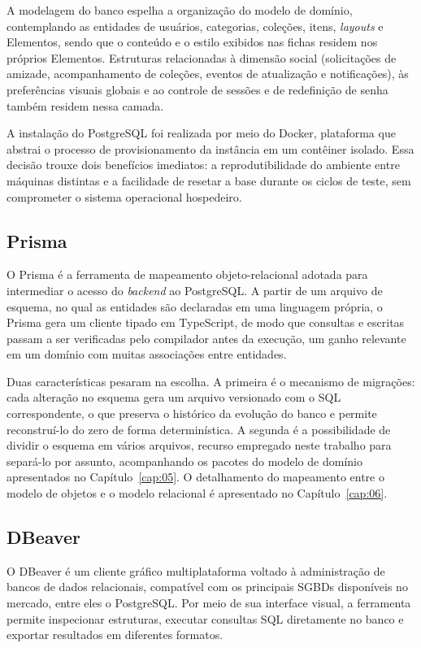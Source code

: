 A modelagem do banco espelha a organização do modelo de domínio, contemplando as entidades de usuários, categorias, coleções, itens, \textit{layouts} e Elementos, sendo que o conteúdo e o estilo exibidos nas fichas residem nos próprios Elementos. Estruturas relacionadas à dimensão social (solicitações de amizade, acompanhamento de coleções, eventos de atualização e notificações), às preferências visuais globais e ao controle de sessões e de redefinição de senha também residem nessa camada.

A instalação do PostgreSQL foi realizada por meio do Docker, plataforma que abstrai o processo de provisionamento da instância em um contêiner isolado. Essa decisão trouxe dois benefícios imediatos: a reprodutibilidade do ambiente entre máquinas distintas e a facilidade de resetar a base durante os ciclos de teste, sem comprometer o sistema operacional hospedeiro.

\subsection{Prisma}

O Prisma é a ferramenta de mapeamento objeto-relacional adotada para intermediar o acesso do \textit{backend} ao PostgreSQL. A partir de um arquivo de esquema, no qual as entidades são declaradas em uma linguagem própria, o Prisma gera um cliente tipado em TypeScript, de modo que consultas e escritas passam a ser verificadas pelo compilador antes da execução, um ganho relevante em um domínio com muitas associações entre entidades.

Duas características pesaram na escolha. A primeira é o mecanismo de migrações: cada alteração no esquema gera um arquivo versionado com o SQL correspondente, o que preserva o histórico da evolução do banco e permite reconstruí-lo do zero de forma determinística. A segunda é a possibilidade de dividir o esquema em vários arquivos, recurso empregado neste trabalho para separá-lo por assunto, acompanhando os pacotes do modelo de domínio apresentados no Capítulo~\ref{cap:05}. O detalhamento do mapeamento entre o modelo de objetos e o modelo relacional é apresentado no Capítulo~\ref{cap:06}.

\subsection{DBeaver}

O DBeaver é um cliente gráfico multiplataforma voltado à administração de bancos de dados relacionais, compatível com os principais SGBDs disponíveis no mercado, entre eles o PostgreSQL. Por meio de sua interface visual, a ferramenta permite inspecionar estruturas, executar consultas SQL diretamente no banco e exportar resultados em diferentes formatos.

